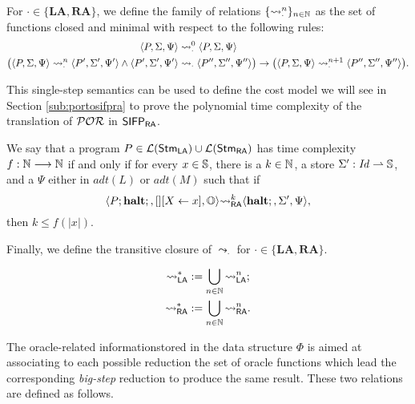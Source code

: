 \begin{defn}
  For $\cdot \in \{\mathbf{LA}, \mathbf{RA}\}$,
  we define the family of relations  $\{\leadsto_\cdot^n\}_{n\in \mathbb{N}}$
  as the set of functions closed and minimal with respect to the following rules:
  $$
  \begin{aligned}
    \langle P, \Sigma, \Psi\rangle &\leadsto_\cdot^0\langle P, \Sigma, \Psi\rangle\\
    \big( \langle P, \Sigma, \Psi\rangle \leadsto_\cdot^n\langle P', \Sigma', \Psi'\rangle \land \langle P', \Sigma', \Psi'\rangle &\leadsto_\cdot\langle P'', \Sigma'', \Psi''\rangle\big) \to\big(
    \langle P, \Sigma, \Psi\rangle \leadsto_\cdot^{n+1}\langle P'', \Sigma'', \Psi''\rangle\big).
  \end{aligned}
  $$
\end{defn}

\noindent
This single-step semantics can be used to define the cost model we will see in Section
\ref{sub:portosifpra} to prove the polynomial time complexity
of the translation of $\mathcal{POR}$ in $\mathsf{SIFP_{{\mathsf{RA}}}}$.

\begin{defn}
  \label{def:sifpcost}
  We say that a program $P \in {\mathcal L ({\mathsf{Stm}_{\mathsf{LA}}})}\cup {\mathcal L ({\mathsf{Stm}_{\mathsf{RA}}})}$
  has time complexity $f: \mathbb{N} \longrightarrow \mathbb{N}$ if and only if for every
  $x\in \mathbb{S}$, there is a $k \in \mathbb{N}$, a store $\Sigma': \mathit{Id} \rightharpoonup \mathbb{S}$,
  and a $\Psi$ either in $\mathit{adt}(L)$ or $\mathit{adt}(M)$ such that if
  $$
  \langle P; \mathbf{halt};, [][X \leftarrow x], \mathbb{O}\rangle {\leadsto_{\mathsf{RA}}^{k}}
  \langle\mathbf{halt};, \Sigma', \Psi\rangle,
  $$
  then $k \le f(|x|)$.
\end{defn}

\noindent
Finally, we define the transitive closure of $\leadsto_\cdot$ for $\cdot \in
\{\mathbf{LA}, \mathbf{RA}\}$.

\begin{defn}
  \begin{align*}
    {\leadsto_{\mathsf{LA}}^{*}} &:= \bigcup_{n \in \mathbb{N}} {\leadsto_{\mathsf{LA}}^{n}};\\
    {\leadsto_{\mathsf{RA}}^{*}} &:= \bigcup_{n \in \mathbb{N}} {\leadsto_{\mathsf{RA}}^{n}}.
  \end{align*}
\end{defn}
\noindent
The oracle-related informationstored in the data structure $\Phi$ is aimed at associating to each possible reduction
the set of oracle functions which lead the corresponding \emph{big-step} reduction to produce the same result.
%
These two relations are defined as follows.

